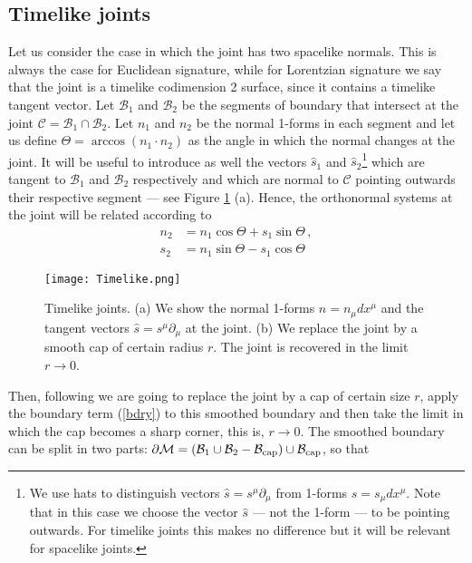 \documentclass[11pt,letterpaper]{article}
\begin{document}
\subsection{Timelike joints}\label{22}
Let us consider the case in which the joint has two spacelike normals. This is always the case for Euclidean signature, while for Lorentzian signature we say that the joint is a timelike codimension 2 surface, since it contains a timelike tangent vector. Let $\mathcal{B}_1$ and $\mathcal{B}_2$ be the segments of boundary that intersect at the joint $\mathcal{C}=\mathcal{B}_1\cap \mathcal{B}_2$. Let $n_1$ and $n_2$ be the normal 1-forms in each segment and let us define $\Theta= \arccos(n_1\cdot n_2)$ as the angle in which the normal changes at the joint. It will be useful to introduce as well the vectors $\hat s_1$ and $\hat s_2$\footnote{We use hats to distinguish vectors $\hat s=s^{\mu}\partial_{\mu}$ from 1-forms $s=s_{\mu}dx^{\mu}$. Note that in this case we choose the vector $\hat s$ --- not the 1-form --- to be pointing outwards. For timelike joints this makes no difference but it will be relevant for spacelike joints.} which are tangent to $\mathcal{B}_1$ and $\mathcal{B}_2$ respectively and which are normal to $\mathcal{C}$ pointing outwards their respective segment --- see Figure \ref{Tmlj} (a). Hence, the orthonormal systems at the joint will be related according to
\begin{equation}\label{rot}
\begin{aligned}
n_2&=n_1 \cos\Theta+s_1 \sin \Theta \, ,\\
s_2&=n_1 \sin\Theta -s_1 \cos \Theta\, 
\end{aligned}
\end{equation}

\begin{figure}[t]
  \centering
   \texttt{[image: Timelike.png]}
  \caption{\small Timelike joints. (a) We show the normal 1-forms $n=n_{\mu}dx^{\mu}$ and the tangent vectors $\hat s=s^{\mu}\partial_{\mu}$ at the joint. (b) We replace the joint by a smooth cap of certain radius $r$. The joint is recovered in the limit $r\rightarrow 0$.}
  \label{Tmlj}
\end{figure}

Then, following \cite{Hayward:1993my} we are going to replace the joint by a cap of certain size $r$, apply the boundary term (\ref{bdry}) to this smoothed boundary and then take the limit in which the cap becomes a sharp corner, this is, $r\rightarrow 0$. The smoothed boundary can be split in two parts: $\partial\mathcal{M}=\left(\mathcal{B}_1\cup\mathcal{B}_2-\mathcal{B}_{\rm cap}\right)\cup \mathcal{B}_{\rm cap}$, so that 
\end{document}
